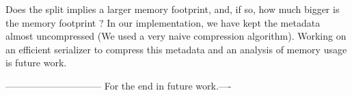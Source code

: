 \documentclass[a4paper,12pt,twoside]{../includes/ThesisStyle}
\begin{document}
Does the split implies a larger memory footprint, and, if so, how much bigger is the memory footprint ? In our implementation, we have kept the metadata almost uncompressed (We used a very naive compression algorithm). Working on an efficient serializer to compress this metadata and an analysis of memory usage is future work.





------------------------------
For the end in future work.----

\ifx\wholebook\relax\else
    
\end{document}
